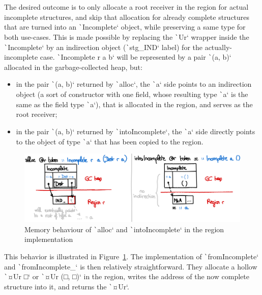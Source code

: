 \documentclass[english]{jflart}
\begin{document}
The desired outcome is to only allocate a root receiver in the region for actual incomplete structures, and skip that allocation for already complete structures that are turned into an \texttt`Incomplete` object, while preserving a same type for both use-cases. This is made possible by replacing the \texttt`Ur` wrapper inside the \texttt`Incomplete` by an indirection object (\texttt`stg_IND` label) for the actually-incomplete case. \texttt`Incomplete r a b` will be represented by a pair \texttt`(a, b)` allocated in the garbage-collected heap, but:
\begin{itemize}
  \item in the pair \texttt`(a, b)` returned by \texttt`alloc`, the \texttt`a` side points to an indirection object (a sort of constructor with one field, whose resulting type \texttt`a` is the same as the field type \texttt`a`), that is allocated in the region, and serves as the root receiver;
  \item in the pair \texttt`(a, b)` returned by \texttt`intoIncomplete`, the \texttt`a` side directly points to the object of type \texttt`a` that has been copied to the region.
\end{itemize}

\begin{figure}[t]\centering
  \includegraphics[width=12cm]{alloc-region.png}
  \caption{Memory behaviour of \texttt`alloc` and \texttt`intoIncomplete` in the region implementation}
  \label{fig:schema-alloc-region}
\end{figure}

This behavior is illustrated in Figure~\ref{fig:schema-alloc-region}. The implementation of \texttt`fromIncomplete` and \texttt`fromIncomplete_` is then relatively straightforward. They allocate a hollow \texttt`¤Ur □` or \texttt`¤Ur (□, □)` in the region, writes the address of the now complete structure into it, and returns the \texttt`¤Ur`.
\end{document}
